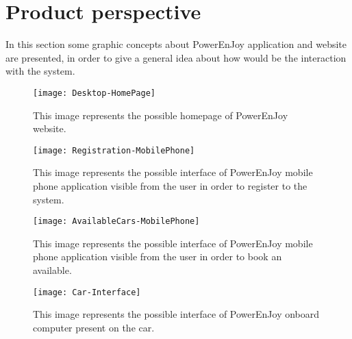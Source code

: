 \section{Product perspective}
In this section some graphic concepts about PowerEnJoy application and website are presented, in order to give a general idea about how would be the interaction with the system. 


\begin{figure}[H]
	\centering
	\texttt{[image: Desktop-HomePage]}
	\caption[Desktop homepage interface]{This image represents the possible homepage of PowerEnJoy website.}
	\label{fig:Desktop-HomePage}
\end{figure}

\begin{figure}[H]
	\centering
	\texttt{[image: Registration-MobilePhone]}
	\caption[Mobile registration interface]{This image represents the possible interface of PowerEnJoy mobile phone application visible from the user in order to register to the system.}
	\label{fig:Registration-MobilePhone}
\end{figure}

\begin{figure}[H]
	\centering
	\texttt{[image: AvailableCars-MobilePhone]}
	\caption[Mobile map interface]{This image represents the possible interface of PowerEnJoy mobile phone application visible from the user in order to book an available.}
	\label{fig:AvailableCars-MobilePhone}
\end{figure}

\begin{figure}[H]
	\centering
	\texttt{[image: Car-Interface]}
	\caption[Onboard computer interface]{This image represents the possible interface of PowerEnJoy onboard computer present on the car.}
	\label{fig:Car-Interface}
\end{figure}